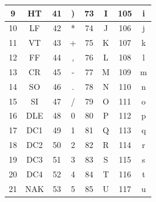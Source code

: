 \begin{longtable}{|c|c|c|c|c|c|c|c|}
    9              & HT            & 41             & )             & 73             & I                      & 105            & i                      \\
    \hline
    10             & LF            & 42             & *             & 74             & J                      & 106            & j                      \\
    \hline
    11             & VT            & 43             & +             & 75             & K                      & 107            & k                      \\
    \hline
    12             & FF            & 44             & ,             & 76             & L                      & 108            & l                      \\
    \hline
    13             & CR            & 45             & -             & 77             & M                      & 109            & m                      \\
    \hline
    14             & SO            & 46             & .             & 78             & N                      & 110            & n                      \\
    \hline
    15             & SI            & 47             & /             & 79             & O                      & 111            & o                      \\
    \hline
    16             & DLE           & 48             & 0             & 80             & P                      & 112            & p                      \\
    \hline
    17             & DC1           & 49             & 1             & 81             & Q                      & 113            & q                      \\
    \hline
    18             & DC2           & 50             & 2             & 82             & R                      & 114            & r                      \\
    \hline
    19             & DC3           & 51             & 3             & 83             & S                      & 115            & s                      \\
    \hline
    20             & DC4           & 52             & 4             & 84             & T                      & 116            & t                      \\
    \hline
    21             & NAK           & 53             & 5             & 85             & U                      & 117            & u                      \\

\end{longtable}
